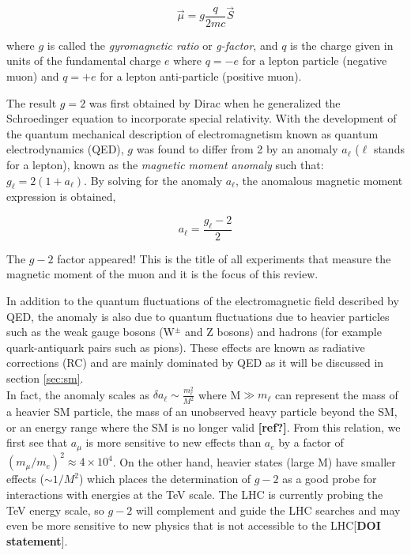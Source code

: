 \documentclass{outhesis}
\begin{document}
\begin{equation}
\overrightarrow{\mu} = g\frac{q}{2mc}\overrightarrow{S}
\label{eq:mu}
\end{equation}

where $g$ is called the \emph{gyromagnetic ratio} or \emph{g-factor}, and $q$ is the charge given in units of the fundamental charge $e$ where $q = -e$ for a lepton particle (negative muon) and $q = +e$ for a lepton anti-particle (positive muon). 

The result $g = 2$ was first obtained by Dirac when he generalized the Schroedinger equation to incorporate special relativity. With the development of the quantum mechanical description of electromagnetism known as quantum electrodynamics (QED), $g$ was found to differ from 2 by an anomaly $a_\ell$ ($\ell$ stands for a lepton), known as the  \emph{magnetic moment anomaly} such that: $g_\ell = 2(1+a_\ell)$. By solving for the anomaly $a_\ell$, the anomalous magnetic moment expression is obtained,

\begin{equation}
a_{\ell} = \frac{g_\ell-2}{2}
\end{equation}


The $g-2$ factor appeared! This is the title of all experiments that measure the magnetic moment of the muon and it is the focus of this review.

In addition to the quantum fluctuations of the electromagnetic field described by QED, the anomaly is also due to quantum fluctuations due to heavier particles such as the weak gauge bosons (W$^{\pm}$ and Z bosons) and hadrons (for example quark-antiquark pairs such as pions). These effects are known as radiative corrections (RC) and are mainly dominated by QED as it will be discussed in section \ref{sec:sm}.\\
In fact, the anomaly scales as $\delta a_\ell \sim \frac{m_\ell^2}{M^2}$  where M$\gg m_\ell$ can represent the mass of a heavier SM particle, the mass of an unobserved heavy particle beyond the SM, or an energy range where the SM is no longer valid \textbf{[ref?]}. From this relation, we first see that $a_{\mu}$ is more sensitive to new effects than $a_e$ by a factor of $\left(m_{\mu}/m_e\right)^2 \approx 4 \times 10^4$. On the other hand, heavier states (large M) have smaller effects ($\sim 1/M^2$) which places the determination of $g-2$ as a good probe for interactions with energies at the TeV scale. The LHC is currently probing the TeV energy scale, so $g-2$ will complement and guide the LHC searches and may even be more sensitive to new physics that is not accessible to the LHC[\textbf{DOI statement}]. 
\end{document}
